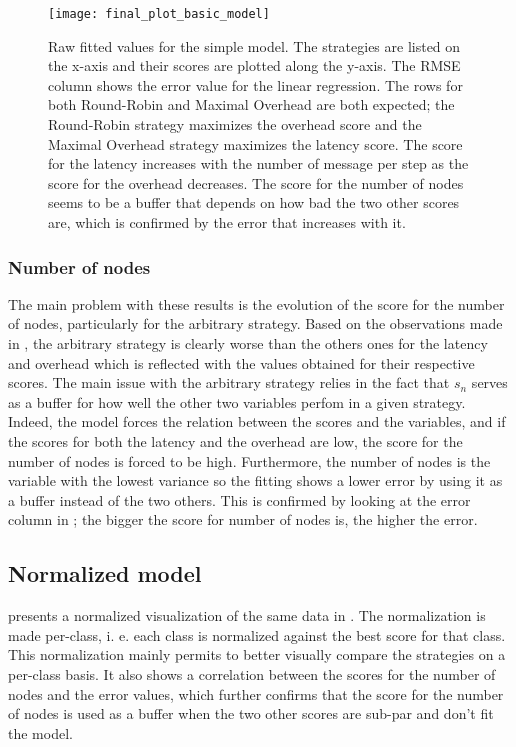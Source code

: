 \begin{figure}[h]
    \centering
    \texttt{[image: final\_plot\_basic\_model]}
    \caption{Raw fitted values for the simple model. The strategies are listed
    on the x-axis and their scores are plotted along the y-axis. The RMSE column shows the error value for the linear
        regression. The rows for both Round-Robin and Maximal Overhead are both
        expected; the Round-Robin strategy maximizes the overhead score and the
        Maximal Overhead strategy maximizes the latency score. The score for the
        latency increases with the number of message per step as the score for
        the overhead decreases. The score for the number of nodes seems to be a
        buffer that depends on how bad the two other scores are, which is
        confirmed by the error that increases with it.
    }
    \label{fig:recapTestsPlot}
\end{figure}

\subsubsection{Number of nodes}
\label{ssec:nbNodes}
The main problem with these results is the evolution of the score for the number
of nodes, particularly for the arbitrary strategy. Based on the observations
made in , the arbitrary strategy is clearly worse than the
others ones for the latency and overhead which is reflected with the values
obtained for their respective scores. The main issue with the arbitrary strategy
relies in the fact that \(s_n\) serves as a buffer for how well the other two
variables perfom in a given strategy.  Indeed, the model forces the relation
between the scores and the variables, and if the scores for both the latency and
the overhead are low, the score for the number of nodes is forced to be high.
Furthermore, the number of nodes is the variable with the lowest variance so the
fitting shows a lower error by using it as a buffer instead of the two others.
This is confirmed by looking at the error column in ; the
bigger the score for number of nodes is, the higher the error. 

\FloatBarrier
\subsection{Normalized model}
 presents a normalized visualization of the same
data in . The normalization is made per-class, i. e.
each class is normalized against the best score for that class. This
normalization mainly permits to better visually compare the strategies on a
per-class basis. It also shows a correlation between the scores for the number
of nodes and the error values, which further confirms that the score for the
number of nodes is used as a buffer when the two other scores are sub-par and
don't fit the model.


